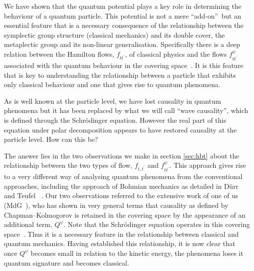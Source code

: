\documentclass[12pt]{article}%
\begin{document}
We have shown that the quantum potential plays a key role in determining the
behaviour of a quantum particle. This potential is not a mere
\textquotedblleft add-on\textquotedblright\ but an essential feature that is a
necessary consequence of the relationship between the symplectic group
structure (classical mechanics) and its double cover, the metaplectic group
and its non-linear generalisation. Specifically there is a deep relation
between the Hamilton flows, $f_{tt^{\prime}}$, of classical physics and the
flows $f_{tt^{\prime}}^{\psi}$ associated with the quantum behaviour in the
covering space~\cite{go15,mdgbh10}. It is this feature that is key to
understanding the relationship between a particle that exhibits only classical
behaviour and one that gives rise to quantum phenomena.

As is well known at the particle level, we have lost causality in quantum
phenomena but it has been replaced by what we will call \textquotedblleft wave
causality\textquotedblright, which is defined through the Schr\"{o}dinger
equation. However the real part of this equation under polar decomposition
appears to have restored causality at the particle level. How can this be?

The answer lies in the two observations we make in section \ref{sec:hbt} about
the relationship between the two types of flow, $f_{t,t^{\prime}}$ and
$f^{\psi}_{tt^{\prime}}$. This approach gives rise to a very different way of
analysing quantum phenomena from the conventional approaches, including the
approach of Bohmian mechanics as detailed in D\"{u}rr and Teufel~\cite{ddst09}%
.
Our two observations referred to the extensive work of one of us
(MdG~\cite{ICP}), who has shown in very general terms that causality as
defined by Chapman--Kolmogorov is retained in the covering space by the
appearance of an additional term, $Q^{\psi}$. Note that the Schr\"{o}dinger
equation operates in this covering space~\cite{vgss84}. Thus it is a necessary
feature in the relationship between classical and quantum mechanics. Having
established this relationship, it is now clear that once $Q^{\psi}$ becomes
small in relation to the kinetic energy, the phenomena loses it quantum
signature and becomes classical.
\end{document}

